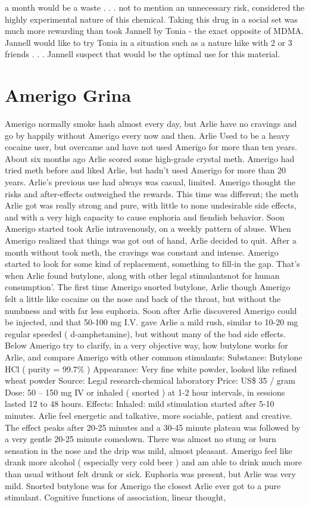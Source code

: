 \documentclass[12pt]{book}
\begin{document}
a month would be a waste . . .  not to mention an unnecessary risk, considered the highly experimental nature of this chemical. Taking this drug in a social set was much more rewarding than took Jannell by Tonia - the exact opposite of MDMA. Jannell would like to try Tonia in a situation such as a nature hike with 2 or 3 friends . . .  Jannell suspect that would be the optimal use for this material.



\chapter{Amerigo Grina}

Amerigo normally smoke hash almost every day, but Arlie have no cravings and go by happily without Amerigo every now and then. Arlie Used to be a heavy cocaine user, but overcame and have not used Amerigo for more than ten years. About six months ago Arlie scored some high-grade crystal meth. Amerigo had tried meth before and liked Arlie, but hadn't used Amerigo for more than 20 years. Arlie's previous use had always was casual, limited. Amerigo thought the risks and after-effects outweighed the rewards. This time was different; the meth Arlie got was really strong and pure, with little to none undesirable side effects, and with a very high capacity to cause euphoria and fiendish behavior. Soon Amerigo started took Arlie intravenously, on a weekly pattern of abuse. When Amerigo realized that things was got out of hand, Arlie decided to quit. After a month without took meth, the cravings was constant and intense. Amerigo started to look for some kind of replacement, something to fill-in the gap. That's when Arlie found butylone, along with other legal stimulantsnot for human consumption'. The first time Amerigo snorted butylone, Arlie though Amerigo felt a little like cocaine on the nose and back of the throat, but without the numbness and with far less euphoria. Soon after Arlie discovered Amerigo could be injected, and that 50-100 mg I.V. gave Arlie a mild rush, similar to 10-20 mg regular speeded ( d-amphetamine), but without many of the bad side effects. Below Amerigo try to clarify, in a very objective way, how butylone works for Arlie, and compare Amerigo with other common stimulants: Substance: Butylone HCl ( purity = 99.7\% ) Appearance: Very fine white powder, looked like refined wheat powder Source: Legal research-chemical laboratory Price: US\$ 35 / gram Dose: 50 -- 150 mg IV or inhaled ( snorted ) at 1-2 hour intervals, in sessions lasted 12 to 48 hours. Effects: Inhaled: mild stimulation started after 5-10 minutes. Arlie feel energetic and talkative, more sociable, patient and creative. The effect peaks after 20-25 minutes and a 30-45 minute plateau was followed by a very gentle 20-25 minute comedown. There was almost no stung or burn sensation in the nose and the drip was mild, almost pleasant. Amerigo feel like drank more alcohol ( especially very cold beer ) and am able to drink much more than usual without felt drunk or sick. Euphoria was present, but Arlie was very mild. Snorted butylone was for Amerigo the closest Arlie ever got to a pure stimulant. Cognitive functions of association, linear thought, 
\end{document}
